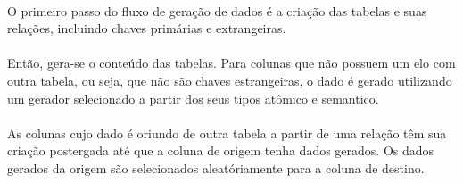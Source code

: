 \paragraph{} O primeiro passo do fluxo de geração de dados é a criação das tabelas e suas relações, incluindo chaves primárias e extrangeiras.

\paragraph{} Então, gera-se o conteúdo das tabelas. Para colunas que não possuem um elo com outra tabela, ou seja, que não são chaves estrangeiras, o dado é gerado utilizando um gerador selecionado a partir dos seus tipos atômico e semantico.

\paragraph{} As colunas cujo dado é oriundo de outra tabela a partir de uma relação têm sua criação postergada até que a coluna de origem tenha dados gerados. Os dados gerados da origem são selecionados aleatóriamente para a coluna de destino.